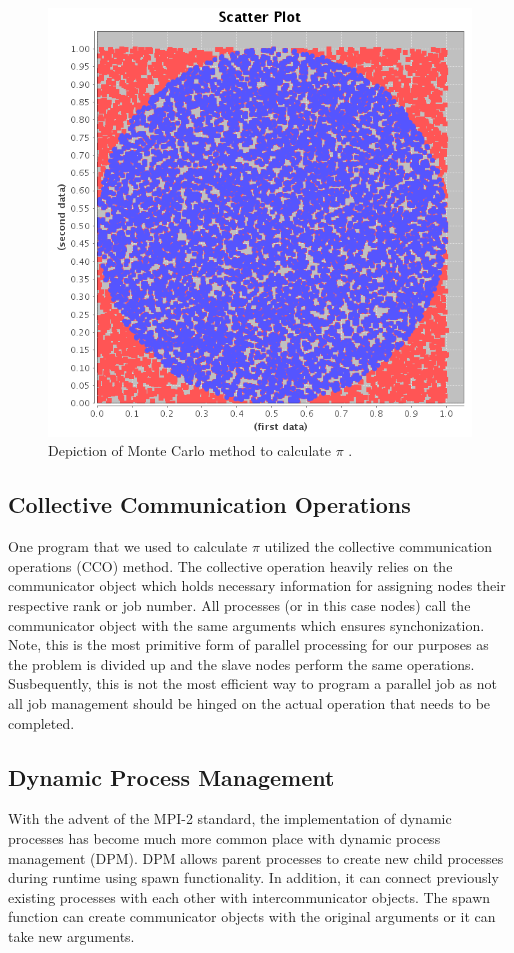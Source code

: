 \begin{figure}
\centering
\includegraphics[scale=0.4]{Figures/monte-carlo}
\decoRule
\caption[Monte-Carlo Method]{Depiction of Monte Carlo method to calculate $\pi$ .}
\label{fig:Monte-carlo}
\end{figure}

\subsection {Collective Communication Operations}

One program that we used to calculate $\pi$ utilized the collective communication operations (CCO) method. The collective operation heavily relies on the communicator object which holds necessary information for assigning nodes their respective rank or job number. All processes (or in this case nodes) call the communicator object with the same arguments which ensures synchonization. Note, this is the most primitive form of parallel processing for our purposes as the problem is divided up and the slave  nodes perform the same operations. Susbequently, this is not the most efficient way to program a parallel job as not all job management should be hinged on the actual operation that needs to be completed.


\subsection {Dynamic Process Management}
With the advent of the MPI-2 standard, the implementation of dynamic processes has become much more common place with dynamic process management (DPM). DPM allows parent processes to create new child processes during runtime using spawn functionality. In addition, it can connect previously existing processes with each other with intercommunicator objects. The spawn function can create communicator objects with the original arguments or it can take new arguments.

